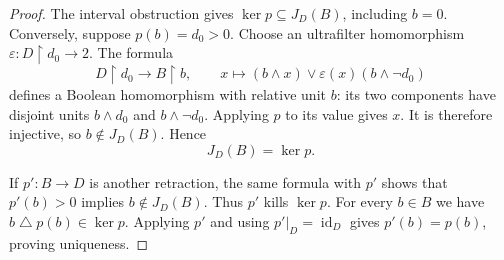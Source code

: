 \documentclass[11pt]{article}
\theoremstyle{definition}
\theoremstyle{remark}
\newcommand{\restr}{\mathbin{\upharpoonright}}
\newcommand{\id}{\operatorname{id}}
\begin{document}
\begin{proof}
The interval obstruction gives $\ker p\subseteq J_D(B)$, including
$b=0$. Conversely, suppose $p(b)=d_0>0$. Choose an ultrafilter
homomorphism $\varepsilon:D\restr d_0\to2$. The formula
\begin{equation}\label{eq:interval-section}
 D\restr d_0\longrightarrow B\restr b,
 \qquad x\longmapsto(b\wedge x)\vee
                  \varepsilon(x)(b\wedge\neg d_0)
\end{equation}
defines a Boolean homomorphism with relative unit $b$: its two
components have disjoint units $b\wedge d_0$ and $b\wedge\neg d_0$.
Applying $p$ to its value gives $x$. It is therefore injective, so
$b\notin J_D(B)$. Hence
\begin{equation}\label{eq:intrinsic-ideal}
 J_D(B)=\ker p.
\end{equation}

If $p':B\to D$ is another retraction, the same formula with $p'$
shows that $p'(b)>0$ implies $b\notin J_D(B)$. Thus $p'$ kills
$\ker p$. For every $b\in B$ we have
$b\mathbin{\triangle}p(b)\in\ker p$. Applying $p'$ and using
$p'|_D=\id_D$ gives $p'(b)=p(b)$, proving uniqueness.
\end{proof}
\end{document}
